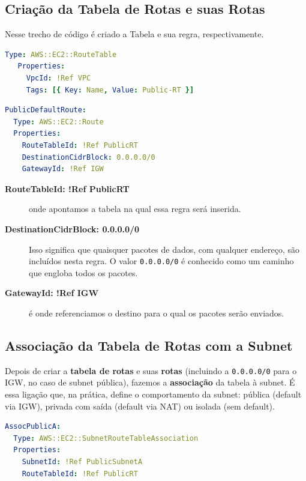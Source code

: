 \subsection{Criação da Tabela de Rotas e suas Rotas}
Nesse trecho de código é criado a Tabela e sua regra, respectivamente.
\begin{lstlisting}[language=yaml, float=htpb]
 Type: AWS::EC2::RouteTable
   Properties:
     VpcId: !Ref VPC
     Tags: [{ Key: Name, Value: Public-RT }]
\end{lstlisting}

\begin{lstlisting}[language=YAML, float=htbp, label={lst:public-default}]
PublicDefaultRoute:
  Type: AWS::EC2::Route
  Properties:
    RouteTableId: !Ref PublicRT
    DestinationCidrBlock: 0.0.0.0/0
    GatewayId: !Ref IGW
\end{lstlisting}

\begin{description}
\item [\textbf{RouteTableId: !Ref PublicRT}] onde apontamos a tabela na qual essa regra será inserida.
\item [\textbf{DestinationCidrBlock: 0.0.0.0/0}] Isso significa que quaisquer pacotes de dados, com qualquer endereço, são incluídos nesta regra. O valor \texttt{0.0.0.0/0} é conhecido como um caminho que engloba todos os pacotes.
\item [\textbf{GatewayId: !Ref IGW}] é onde referenciamos o destino para o qual os pacotes serão enviados.
\end{description}

\subsection{Associação da Tabela de Rotas com a Subnet}
Depois de criar a \textbf{tabela de rotas} e suas \textbf{rotas} (incluindo a \texttt{0.0.0.0/0} para o IGW, no caso de subnet pública), fazemos a \textbf{associação} da tabela à subnet. É essa ligação que, na prática, define o comportamento da subnet: pública (default via IGW), privada com saída (default via NAT) ou isolada (sem default).

\begin{lstlisting}[language=YAML, float=htbp]
AssocPublicA:
  Type: AWS::EC2::SubnetRouteTableAssociation
  Properties:
    SubnetId: !Ref PublicSubnetA
    RouteTableId: !Ref PublicRT
\end{lstlisting}

